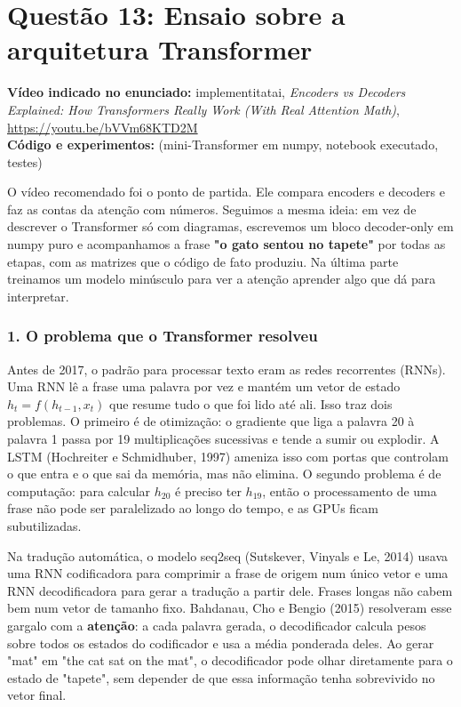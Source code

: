 \documentclass[12pt, a4paper]{article}
\DeclareRobustCommand{\texttt}[1]{\breakabletexttt{#1}}
\begin{document}
\section{Questão 13: Ensaio sobre a arquitetura Transformer}
\label{sec:q13}

\textbf{Vídeo indicado no enunciado:} implementitatai, \emph{Encoders vs Decoders Explained: How Transformers Really Work (With Real Attention Math)}, \url{https://youtu.be/bVVm68KTD2M}\\
\textbf{Código e experimentos:} \texttt{src/q13\_transformers/} (mini-Transformer em numpy, notebook executado, testes)

O vídeo recomendado foi o ponto de partida. Ele compara encoders e decoders e faz as contas da atenção com números. Seguimos a mesma ideia: em vez de descrever o Transformer só com diagramas, escrevemos um bloco decoder-only em numpy puro e acompanhamos a frase \textbf{"o gato sentou no tapete"} por todas as etapas, com as matrizes que o código de fato produziu. Na última parte treinamos um modelo minúsculo para ver a atenção aprender algo que dá para interpretar.

\subsubsection{1. O problema que o Transformer resolveu}\label{1-o-problema-que-o-transformer-resolveu}

Antes de 2017, o padrão para processar texto eram as redes recorrentes (RNNs). Uma RNN lê a frase uma palavra por vez e mantém um vetor de estado \(h_t = f(h_{t-1}, x_t)\) que resume tudo o que foi lido até ali. Isso traz dois problemas. O primeiro é de otimização: o gradiente que liga a palavra 20 à palavra 1 passa por 19 multiplicações sucessivas e tende a sumir ou explodir. A LSTM (Hochreiter e Schmidhuber, 1997) ameniza isso com portas que controlam o que entra e o que sai da memória, mas não elimina. O segundo problema é de computação: para calcular \(h_{20}\) é preciso ter \(h_{19}\), então o processamento de uma frase não pode ser paralelizado ao longo do tempo, e as GPUs ficam subutilizadas.

Na tradução automática, o modelo seq2seq (Sutskever, Vinyals e Le, 2014) usava uma RNN codificadora para comprimir a frase de origem num único vetor e uma RNN decodificadora para gerar a tradução a partir dele. Frases longas não cabem bem num vetor de tamanho fixo. Bahdanau, Cho e Bengio (2015) resolveram esse gargalo com a \textbf{atenção}: a cada palavra gerada, o decodificador calcula pesos sobre todos os estados do codificador e usa a média ponderada deles. Ao gerar "mat" em "the cat sat on the mat", o decodificador pode olhar diretamente para o estado de "tapete", sem depender de que essa informação tenha sobrevivido no vetor final.
\end{document}
